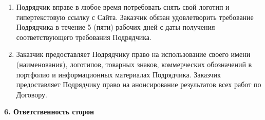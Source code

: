 \documentclass[a4paper, fontsize=12bp]{article}
\newcounter{enum}
\begin{document}
\begin{enumerate}[label=\arabic{enum}.\arabic*.]
\item Подрядчик вправе в любое время потребовать снять свой логотип и гипертекстовую ссылку с Сайта. Заказчик обязан удовлетворить требование Подрядчика в течение 5 (пяти) рабочих дней с даты получения соответствующего требования Подрядчика.

\item Заказчик предоставляет Подрядчику право на использование своего имени (наименования), логотипов, товарных знаков, коммерческих обозначений в портфолио и информационных материалах Подрядчика. Заказчик предоставляет Подрядчику право на анонсирование результатов всех работ по Договору.
\end{enumerate}


\begin{center}
\newpage
\textbf{6. Ответственность сторон}
\end{center}
\end{document}

